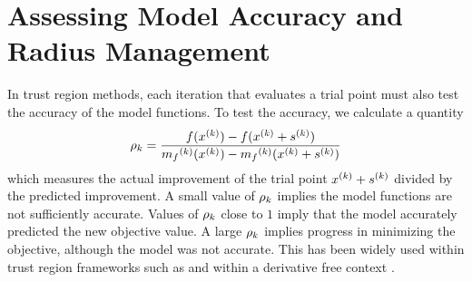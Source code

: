 %
%



\section{Assessing Model Accuracy and Radius Management}
\label{rhosection}
In trust region methods, each iteration that evaluates a trial point must also test the accuracy of the model functions.
To test the accuracy, we calculate a quantity
\begin{align}
\label{define_rhok}
\rho_k = \frac{f(x^{(k)}) - f(x^{(k)}+{{s}^{(k)}})}{{{m}_f}^{(k)}(x^{(k)}) - {{m}_f}^{(k)}(x^{(k)}+{{s}^{(k)}})}
\end{align}
which measures the actual improvement of the trial point $x^{(k)}+{{s}^{(k)}}$ divided by the predicted improvement.
A small value of $\rho_k$ implies the model functions are not sufficiently accurate.
Values of $\rho_k$ close to $1$ imply that the model accurately predicted the new objective value.
A large $\rho_k$ implies progress in minimizing the objective, although the model was not accurate.
This has been widely used within trust region frameworks such as \cite{Conn:2000:TM:357813} and within a derivative free context \cite{introduction_book}.

